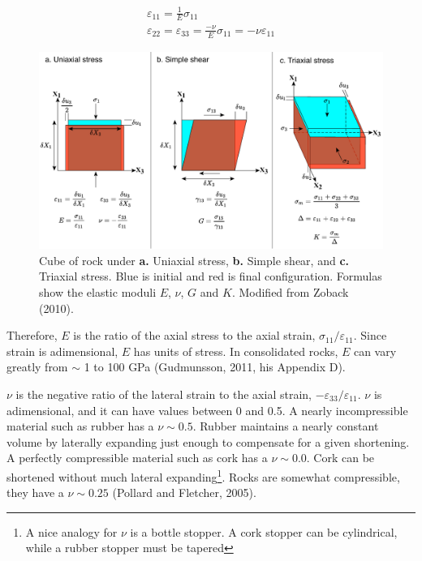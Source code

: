 \documentclass[a4paper , 12pt]{book}
\begin{document}
\begin{equation}
    \begin{gathered}
        \varepsilon_{11}=\frac{1}{E}\sigma_{11} \\
        \varepsilon_{22} = \varepsilon_{33} = \frac{-\nu}{E}\sigma_{11} = -\nu\varepsilon_{11}
    \end{gathered}
\end{equation}

\begin{figure}[ht]
    \centering
    \includegraphics[width=14cm]{ch9f2.pdf}
    \caption{Cube of rock under \textbf{a.} Uniaxial stress, \textbf{b.} Simple shear, and \textbf{c.} Triaxial stress. Blue is initial and red is final configuration. Formulas show the elastic moduli $E$, $\nu$, $G$ and $K$.  Modified from Zoback (2010).}
\end{figure}

Therefore, $E$ is the ratio of the axial stress to the axial strain, $\sigma_{11}/\varepsilon_{11}$. Since strain is adimensional, $E$ has units of stress. In consolidated rocks, $E$ can vary greatly from $\sim$ 1 to 100 GPa (Gudmunsson, 2011, his Appendix D). 

$\nu$ is the negative ratio of the lateral strain to the axial strain, $-\varepsilon_{33}/\varepsilon_{11}$. $\nu$ is adimensional, and it can have values between 0 and 0.5. A nearly incompressible material such as rubber has a $\nu \sim 0.5$. Rubber maintains a nearly constant volume by laterally expanding just enough to compensate for a given shortening. A perfectly compressible material such as cork has a $\nu \sim 0.0$. Cork can be shortened without much lateral expanding\footnote{A nice analogy for $\nu$ is a bottle stopper. A cork stopper can be cylindrical, while a rubber stopper must be tapered}. Rocks are somewhat compressible, they have a $\nu \sim 0.25$ (Pollard and Fletcher, 2005).
\end{document}
